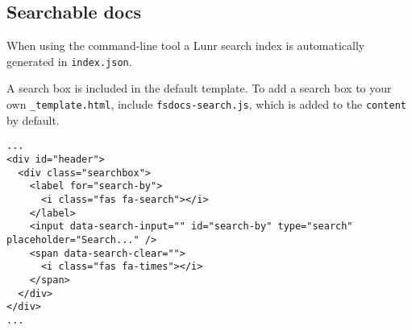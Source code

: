 \documentclass{article}
\begin{document}
\subsection*{Searchable docs}



When using the command-line tool a Lunr search index is automatically generated in \texttt{index.json}.


A search box is included in the default template.  To add a search box
to your own \texttt{\_template.html}, include \texttt{fsdocs-search.js}, which is added to the \texttt{content}
by default.
\begin{lstlisting}
...
<div id="header">
  <div class="searchbox">
    <label for="search-by">
      <i class="fas fa-search"></i>
    </label>
    <input data-search-input="" id="search-by" type="search" placeholder="Search..." />
    <span data-search-clear="">
      <i class="fas fa-times"></i>
    </span>
  </div>
</div>
...

\end{lstlisting}
\end{document}
